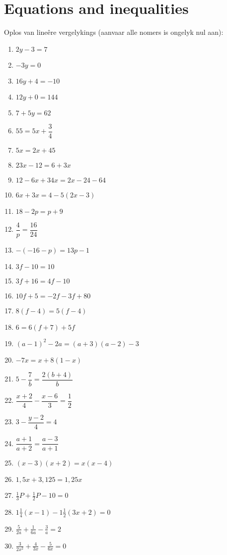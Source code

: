 \chapter{Equations and inequalities}

\begin{exercises}{}
{
Oplos van lineêre vergelykings (aanvaar alle nomers is ongelyk nul aan): \\
\begin{multicols}{2}
\begin{enumerate}[itemsep=5pt, label=\textbf{\arabic*}. ] 
\item   $2y-3=7$
\item   $-3y=0$        
\item   $16y+4=-10$        
\item   $12y+0=144$
\item   $7+5y=62$       
\item  $55=5x+\dfrac{3}{4}$ 
\item   $5x=2x+45$        
\item  $23x-12=6+3x$
\item   $12-6x+34x=2x-24-64$
\item   $6x+3x=4-5(2x-3)$
\item   $18-2p=p+9$   
\item   $\dfrac{4}{p}=\dfrac{16}{24}$
\item   $-(-16-p)=13p-1$
\item   $3f-10=10$
\item   $3f+16=4f-10$
\item   $10f+5=-2f-3f+80$
\item   $8(f-4)=5(f-4)$
\item  $6=6(f+7)+5f$      
\item $(a-1)^{2} - 2a = (a+3)(a-2) - 3$
\item $-7x = x+8(1-x)$ 
\item $5-\dfrac{7}{b} = \dfrac{2(b+4)}{b}$
\item $\dfrac{x+2}{4} - \dfrac{x-6}{3} = \dfrac{1}{2}$
\item $ 3 - \dfrac{y-2}{4} = 4$
\item $ \dfrac{a+1}{a+2} = \dfrac{a-3}{a+1}$
\item $(x-3)(x+2)=x(x-4)$
\item $1,5x+3,125=1,25x$
\item $\frac{1}{3}P + \frac{1}{2}P - 10 = 0$
\item $1 \frac{1}{4} (x-1)-1\frac{1}{2}(3x+2)=0$
\item $\frac{5}{2a}+\frac{1}{6a}-\frac{3}{a}=2$
\item $\frac{3}{2x^2}+\frac{4}{3x}-\frac{5}{6x}=0$  
\end{enumerate}
\end{multicols}

}
\end{exercises}


